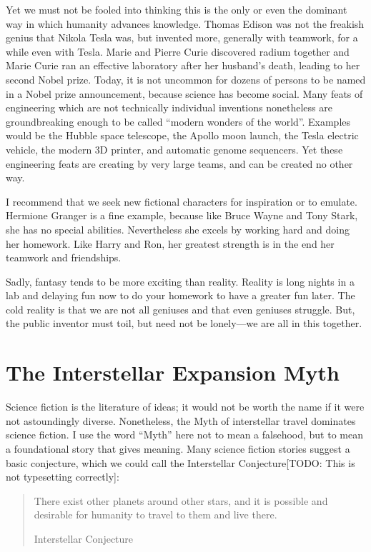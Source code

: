 \documentclass[
	fontsize=10pt, %
	twoside=false, %
	secnumdepth=1, %
]{kaobook}
\begin{document}
Yet we must not be fooled into thinking this is the only or even the dominant way in which humanity advances knowledge.
Thomas Edison was not the freakish genius that Nikola Tesla was, but invented more, generally with teamwork, for a while even with Tesla.
Marie and Pierre Curie discovered radium together and Marie Curie ran an effective laboratory after her husband's death, leading to her second Nobel prize.
Today, it is not uncommon for dozens of persons to be named in a Nobel prize announcement, because science has become social.
Many feats of engineering which are not technically individual inventions nonetheless are groundbreaking enough to
be called ``modern wonders of the world''.
Examples would be the Hubble space telescope, the Apollo moon launch, the Tesla electric vehicle, the modern 3D printer, and automatic genome sequencers.
Yet these engineering feats are creating by very large teams, and can be created no other way.

I recommend that we seek new fictional characters for inspiration or to emulate. Hermione Granger is a fine example, because like Bruce Wayne and Tony Stark,
she has no special abilities\cite{rowling2015harry}.
Nevertheless she excels by working hard and doing her homework. Like Harry and Ron, her greatest strength is in the end her
teamwork and friendships.

Sadly, fantasy tends to be more exciting than reality.
Reality is long nights in a lab and delaying fun now to do your homework to have a greater fun later.
The cold reality is that we are not all geniuses and that even geniuses struggle.
But, the public inventor must toil, but need not be lonely---we are all in this together.

\section{The Interstellar Expansion Myth}

Science fiction is the literature of ideas; it would not be worth the name if it were not astoundingly diverse.
Nonetheless, the Myth of interstellar travel dominates science fiction.
I use the word ``Myth'' here not to mean a falsehood, but to mean a foundational story that gives meaning.
Many science fiction stories suggest a basic conjecture, which we could call the Interstellar Conjecture[TODO: This is not typesetting correctly]:

\blockquote[Interstellar Conjecture]{
  There exist other planets around other stars, and it is possible and desirable for humanity to travel to them and live there.
}
\end{document}
